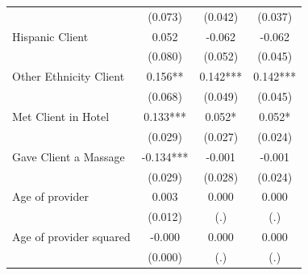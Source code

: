 \documentclass{beamer}
\begin{document}
\begin{frame}[plain]
\begin{table}[htbp]
\begin{center}
\begin{threeparttable}
\begin{tabular}{l*{3}{c}}
                    									&     (0.073)   &     (0.042)   &     (0.037) \\
Hispanic Client     									&       0.052   &      -0.062   &      -0.062 \\
                    									&     (0.080)   &     (0.052)   &     (0.045) \\
Other Ethnicity Client									&       0.156** &       0.142***&       0.142*** \\
                    									&     (0.068)   &     (0.049)   &     (0.045) \\
Met Client in Hotel 									&       0.133***&       0.052*  &       0.052* \\
                    									&     (0.029)   &     (0.027)   &     (0.024) \\
Gave Client a Massage									&      -0.134***&      -0.001   &      -0.001 \\
                    									&     (0.029)   &     (0.028)   &     (0.024) \\
Age of provider     									&       0.003   &       0.000   &       0.000 \\
                    									&     (0.012)   &         (.)   &         (.) \\
Age of provider squared									&      -0.000   &       0.000   &       0.000 \\
                    									&     (0.000)   &         (.)   &         (.) \\
\end{tabular}
\end{threeparttable}
\end{center}
\end{table}

\end{frame}
\end{document}
